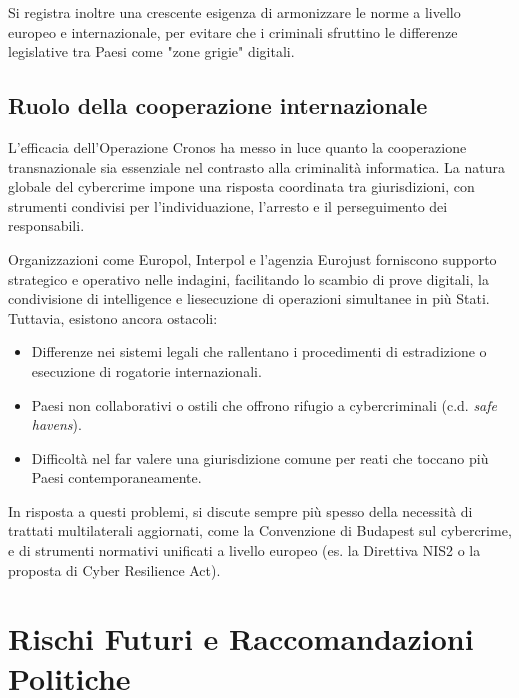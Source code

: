 \documentclass[a4paper,12pt]{article}
\begin{document}
Si registra inoltre una crescente esigenza di armonizzare le norme a livello europeo e internazionale, per evitare che i criminali sfruttino le differenze legislative tra Paesi come "zone grigie" digitali.

\subsection{Ruolo della cooperazione internazionale}
L'efficacia dell'Operazione Cronos ha messo in luce quanto la cooperazione transnazionale sia essenziale nel contrasto alla criminalità informatica. La natura globale del cybercrime impone una risposta coordinata tra giurisdizioni, con strumenti condivisi per l'individuazione, l'arresto e il perseguimento dei responsabili.

Organizzazioni come Europol, Interpol e l'agenzia Eurojust forniscono supporto strategico e operativo nelle indagini, facilitando lo scambio di prove digitali, la condivisione di intelligence e liesecuzione di operazioni simultanee in più Stati. Tuttavia, esistono ancora ostacoli:

\begin{itemize}
    \item Differenze nei sistemi legali che rallentano i procedimenti di estradizione o esecuzione di rogatorie internazionali.
    \item Paesi non collaborativi o ostili che offrono rifugio a cybercriminali (c.d. \textit{safe havens}).
    \item Difficoltà nel far valere una giurisdizione comune per reati che toccano più Paesi contemporaneamente.
\end{itemize}

In risposta a questi problemi, si discute sempre più spesso della necessità di trattati multilaterali aggiornati, come la Convenzione di Budapest sul cybercrime, e di strumenti normativi unificati a livello europeo (es. la Direttiva NIS2 o la proposta di Cyber Resilience Act).


\section{Rischi Futuri e Raccomandazioni Politiche}
\end{document}
